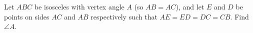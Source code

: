 Let $ABC$ be isosceles with vertex angle $A$ (so $AB=AC$), and let $E$ and $D$ be points on sides $AC$ and $AB$ respectively such that $AE=ED=DC=CB$. Find $\angle A$.
